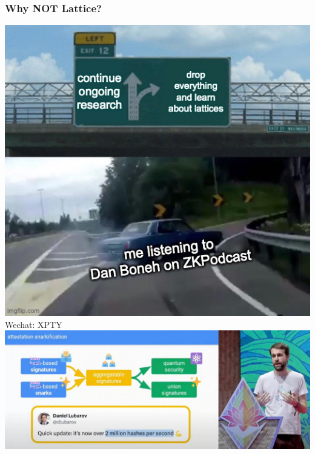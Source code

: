 \documentclass{beamer}
\begin{document}
\begin{frame}
	\frametitle{Why NOT Lattice?}
	\includegraphics[scale=0.25]{danboneh.png}
	Wechat: XPTY
	\includegraphics[scale=0.35]{justin-lattice.jpg}
\end{frame}
\end{document}
